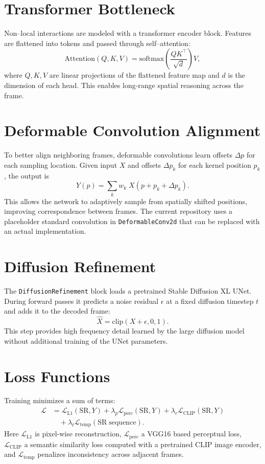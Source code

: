 \documentclass{article}
\begin{document}
\section{Transformer Bottleneck}
Non--local interactions are modeled with a transformer encoder block. Features are flattened into tokens and passed through self--attention:
\begin{equation}
\mathrm{Attention}(Q,K,V) = \mathrm{softmax}\left(\frac{QK^{\top}}{\sqrt{d}}\right)V,
\end{equation}
where $Q,K,V$ are linear projections of the flattened feature map and $d$ is the dimension of each head. This enables long-range spatial reasoning across the frame.
\section{Deformable Convolution Alignment}
To better align neighboring frames, deformable convolutions learn offsets $\Delta p$ for each sampling location. Given input $X$ and offsets $\Delta p_{k}$ for each kernel position $p_{k}$, the output is
\begin{equation}
Y(p) = \sum_{k} w_{k} \; X(p+p_{k}+\Delta p_{k}).
\end{equation}
This allows the network to adaptively sample from spatially shifted positions, improving correspondence between frames. The current repository uses a placeholder standard convolution in \texttt{DeformableConv2d} that can be replaced with an actual implementation.
\section{Diffusion Refinement}
The \texttt{DiffusionRefinement} block loads a pretrained Stable Diffusion XL UNet. During forward passes it predicts a noise residual $\epsilon$ at a fixed diffusion timestep $t$ and adds it to the decoded frame:
\begin{equation}
\hat{X} = \mathrm{clip}(X + \epsilon, 0, 1).
\end{equation}
This step provides high frequency detail learned by the large diffusion model without additional training of the UNet parameters.
\section{Loss Functions}
Training minimizes a sum of terms:
\begin{align}
\mathcal{L} &= \mathcal{L}_{\mathrm{L1}}(\mathrm{SR}, Y) + \lambda_{p} \mathcal{L}_{\mathrm{perc}}(\mathrm{SR}, Y) + \lambda_{c} \mathcal{L}_{\mathrm{CLIP}}(\mathrm{SR}, Y) \\
&\quad+ \lambda_{t} \mathcal{L}_{\mathrm{temp}}(\mathrm{SR\;sequence}).
\end{align}
Here $\mathcal{L}_{\mathrm{L1}}$ is pixel-wise reconstruction, $\mathcal{L}_{\mathrm{perc}}$ a VGG16 based perceptual loss, $\mathcal{L}_{\mathrm{CLIP}}$ a semantic similarity loss computed with a pretrained CLIP image encoder, and $\mathcal{L}_{\mathrm{temp}}$ penalizes inconsistency across adjacent frames.
\end{document}
